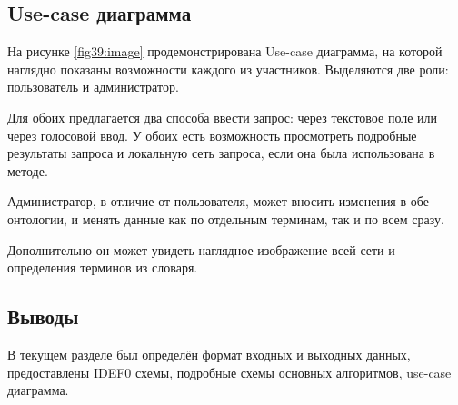 \subsection{Use-case диаграмма}
На рисунке \ref{fig39:image} продемонстрирована Use-case диаграмма, на которой наглядно показаны возможности каждого из участников. Выделяются две роли: пользователь и администратор. 

Для обоих предлагается два способа ввести запрос: через текстовое поле или через голосовой ввод. У обоих есть возможность просмотреть подробные результаты запроса  и локальную сеть запроса, если она была использована в методе.

Администратор, в отличие от пользователя, может вносить изменения в обе онтологии, и менять данные как по отдельным терминам, так и по всем сразу.

Дополнительно он может увидеть наглядное изображение всей сети и \, определения терминов из словаря.

\subsection*{Выводы}
В текущем разделе был определён формат входных и выходных данных, предоставлены IDEF0 схемы, подробные схемы основных алгоритмов, use-case диаграмма.
